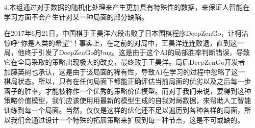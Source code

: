 \documentclass[a4paper]{article}
\begin{document}
\begin{multicols}{2}
4.本组通过对于数据的随机化处理来产生更加具有特殊性的数据，来保证人智能在学习方面不会产生针对某一种局面的部分缺陷。\par
在2017年6月21日，中国棋手王昊洋六段击败了日本围棋程序DeepZenGo，让柯洁惊呼“你是人类的希望”！事实上，在之前的对局中，王昊洋连连败退，直到这一局，他终于引发了DeepZenGo的bug。这是由于这个AI的局部胜率判断错误，导致它在全局采取的策略出现极大的改变，最终败于王昊洋。局后DeepZenGo开发者加藤英树也承认，这是由于该局面的稀有性，导致AI在学习的过程中忽略了这一棋局状态。所以，只有在任何局面下都能正确评估当前局面的优劣以及之后每一步落子的胜率，才能被称作一个优秀的策略价值模型。而对于我们来说，要得到这种策略价值模型，我们应该使用用最新的模型生成的自我对局数据，来帮助人工智能训练到每一个局面。当然，仅仅是这样的优化还不足以遍历到各种各样的局面，所以我们会通过设计一个特殊的拓展策略来扩展到每一种节点，这是不可或缺的。\par

\end{multicols}
\end{document}
